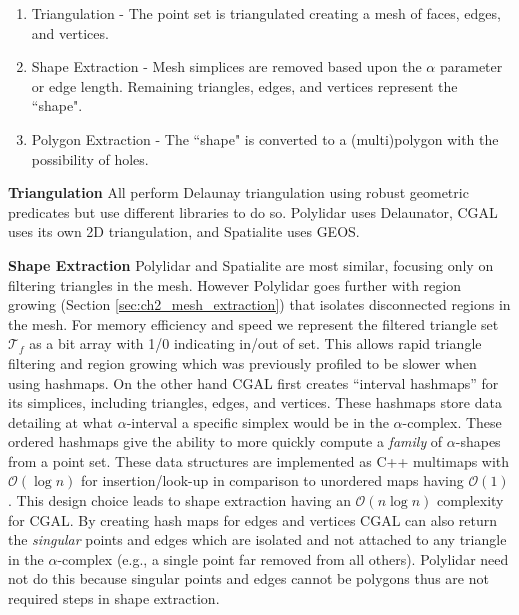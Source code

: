 \begin{enumerate}
    \item Triangulation - The point set is triangulated creating a mesh of faces, edges, and vertices.
    \item Shape Extraction - Mesh simplices are removed based upon the $\alpha$ parameter or edge length. Remaining triangles, edges, and vertices represent the ``shape".
    \item Polygon Extraction - The ``shape" is converted to a (multi)polygon with the possibility of holes.
\end{enumerate}

\textbf{Triangulation} All perform Delaunay triangulation using robust geometric predicates but use different libraries to do so. Polylidar uses Delaunator, CGAL uses its own 2D triangulation, and Spatialite uses GEOS. 

\textbf{Shape Extraction} Polylidar and Spatialite are most similar, focusing only on filtering triangles in the mesh. However Polylidar goes further with region growing (Section \ref{sec:ch2_mesh_extraction}) that isolates disconnected regions in the mesh. For memory efficiency and speed we represent the filtered triangle set $\mathcal{T}_f$ as a bit array with 1/0 indicating in/out of set. This allows rapid triangle filtering and region growing which was previously profiled to be slower when using hashmaps. On the other hand CGAL first creates ``interval hashmaps'' for its simplices, including triangles, edges, and vertices.  These hashmaps store data detailing at what $\alpha$-interval a specific simplex would be in the $\alpha$-complex. These ordered hashmaps give the ability to more quickly compute a \emph{family} of $\alpha$-shapes from a point set. These data structures are implemented as C++ multimaps with $\mathcal{O}(\log{}n)$ for insertion/look-up in comparison to unordered maps having $\mathcal{O}(1)$. This design choice leads to shape extraction having an $\mathcal{O}(n \log{}n)$ complexity for CGAL. By creating hash maps for edges and vertices CGAL can also return the \emph{singular} points and edges which are isolated and not attached to any triangle in the $\alpha$-complex (e.g., a single point far removed from all others). Polylidar need not do this because singular points and edges cannot be polygons thus are not required steps in shape extraction.


